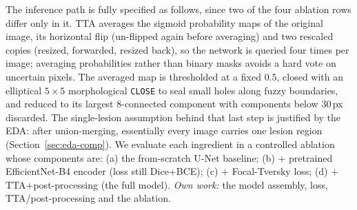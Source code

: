 \documentclass[11pt]{article}
\begin{document}
The inference path is fully specified as follows, since two of the four ablation
rows differ only in it. TTA averages the sigmoid probability maps of the original
image, its horizontal flip (un-flipped again before averaging) and two rescaled
copies (resized, forwarded, resized back), so the network is queried four times per
image; averaging probabilities rather than binary masks avoids a hard vote on
uncertain pixels. The averaged map is thresholded at a fixed $0.5$, closed with an
elliptical $5\times5$ morphological \texttt{CLOSE} to seal small holes along fuzzy
boundaries, and reduced to its largest 8-connected component with components below
$30$\,px discarded. The single-lesion assumption behind that last step is
justified by the EDA: after union-merging, essentially every image carries one
lesion region (Section~\ref{sec:eda-comp}). We evaluate each ingredient in a controlled ablation whose
components are: (a) the from-scratch U-Net baseline; (b) $+$ pretrained EfficientNet-B4
encoder (loss still Dice+BCE); (c) $+$ Focal-Tversky loss; (d) $+$
TTA+post-processing (the full model). \emph{Own work:} the model assembly, loss,
TTA/post-processing and the ablation.
\end{document}
